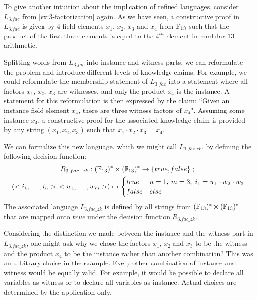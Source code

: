\begin{example}[3-factorization]
\label{ex:L-3fac-zk}
 To give another intuition about the implication of refined languages, consider $L_{3.fac}$ from \examplename{} \ref{ex:3-factorization} again. As we have seen, a constructive proof in $L_{3.fac}$ is given by $4$ field elements $x_1$, $x_2$, $x_3$ and $x_4$ from $\mathbb{F}_{13}$ such that the product of the first three elements is equal to the $4^{th}$ element in modular $13$ arithmetic. 

Splitting words from $L_{3.fac}$ into instance and witness parts, we can reformulate the problem and introduce different levels of knowledge-claims. For example, we could reformulate the membership statement of $L_{3.fac}$ into a statement where all factors $x_1$, $x_2$, $x_3$ are witnesses, and only the product $x_4$ is the instance. A statement for this reformulation is then expressed by the claim: ``Given an instance field element $x_4$, there are three witness factors of $x_4$". Assuming some instance $x_4$, a constructive proof for the associated knowledge claim is provided by any string $(x_1,x_2,x_3)$ such that $x_1\cdot x_2\cdot x_3= x_4$. 

We can formalize this new language, which we might call $L_{3.fac\_zk}$, by defining the following decision function:
\begin{multline*}
\label{R3-fac-zk}
R_{3.fac\_zk} : (\mathbb{F}_{13})^* \times (\mathbb{F}_{13})^* \to \{true, false\}\;;\;\\
(<i_1,\ldots,i_n>;<w_1,\ldots, w_m>) \mapsto
\begin{cases}
true & n=1,\; m=3,\; i_1 = w_1\cdot w_2 \cdot w_3\\
false & else
\end{cases}
\end{multline*}
The associated language $L_{3.fac\_zk}$ is defined by all strings from $(\mathbb{F}_{13})^* \times (\mathbb{F}_{13})^*$ that are mapped onto $true$ under the decision function $R_{3.fac\_zk}$. 

Considering the distinction we made between the instance and the witness part in $L_{3.fac\_zk}$, one might ask why we chose the factors $x_1$, $x_2$ and $x_3$ to be the witness and the product $x_4$ to be the instance rather than another combination? This was an arbitrary choice in the example. Every other combination of instance and witness would be equally valid. For example, it would be possible to declare all variables as witness or to declare all variables as instance. Actual choices are determined by the application only.
\end{example}
